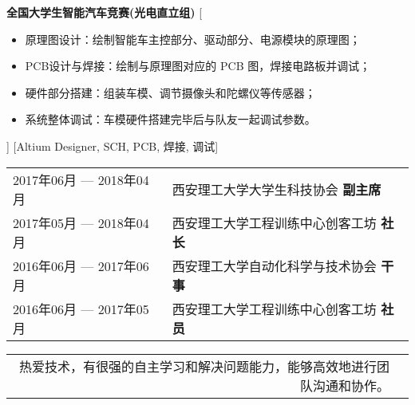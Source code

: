 \documentclass[zh]{resume}
\begin{document}
\begin{experiences}
    {\textbf{全国大学生智能汽车竞赛(光电直立组)}}
    [%
        \begin{itemize}
            \item {原理图设计：绘制智能车主控部分、驱动部分、电源模块的原理图；}
            \item {PCB设计与焊接：绘制与原理图对应的 PCB 图，焊接电路板并调试；}
            \item {硬件部分搭建：组装车模、调节摄像头和陀螺仪等传感器；}
            \item {系统整体调试：车模硬件搭建完毕后与队友一起调试参数。}
        \end{itemize}]
    [Altium Designer, SCH, PCB, 焊接, 调试]
\end{experiences}

\begin{table}[!htbp]
    \begin{tabular}{ll}
        2017年06月 --- 2018年04月 & 西安理工大学大学生科技协会 \textbf{副主席}     \\
        2017年05月 --- 2018年04月 & 西安理工大学工程训练中心创客工坊 \textbf{社长} \\
        2016年06月 --- 2017年06月 & 西安理工大学自动化科学与技术协会 \textbf{干事} \\
        2016年06月 --- 2017年05月 & 西安理工大学工程训练中心创客工坊 \textbf{社员} \\
    \end{tabular}
\end{table}

\begin{table}[!htbp]
    \begin{tabular}{rl}
        热爱技术，有很强的自主学习和解决问题能力，能够高效地进行团队沟通和协作。
    \end{tabular}
\end{table}
\end{document}
